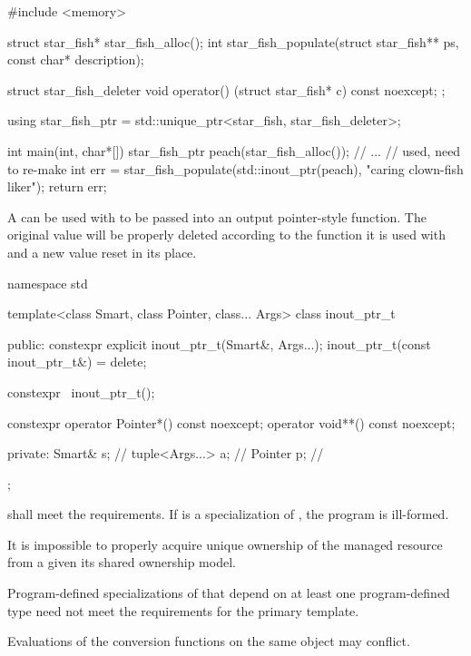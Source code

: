 \pnum
\begin{example}
\begin{codeblock}
#include <memory>

struct star_fish* star_fish_alloc();
int star_fish_populate(struct star_fish** ps, const char* description);

struct star_fish_deleter {
  void operator() (struct star_fish* c) const noexcept;
};

using star_fish_ptr = std::unique_ptr<star_fish, star_fish_deleter>;

int main(int, char*[]) {
  star_fish_ptr peach(star_fish_alloc());
  // ...
  // used, need to re-make
  int err = star_fish_populate(std::inout_ptr(peach), "caring clown-fish liker");
  return err;
}
\end{codeblock}
A  can be used with 
to be passed into an output pointer-style function.
The original value will be properly deleted
according to the function it is used with and
a new value reset in its place.
\end{example}

%
\begin{codeblock}
namespace std {
  template<class Smart, class Pointer, class... Args>
  class inout_ptr_t {
  public:
    constexpr explicit inout_ptr_t(Smart&, Args...);
    inout_ptr_t(const inout_ptr_t&) = delete;

    constexpr ~inout_ptr_t();

    constexpr operator Pointer*() const noexcept;
    operator void**() const noexcept;

  private:
    Smart& s;                   // \expos
    tuple<Args...> a;           // \expos
    Pointer p;                  // \expos
  };
}
\end{codeblock}

\pnum
{} shall meet the  requirements.
If  is a specialization of ,
the program is ill-formed.
\begin{note}
It is impossible to properly acquire unique ownership of the managed resource
from a  given its shared ownership model.
\end{note}

\pnum
Program-defined specializations of 
that depend on at least one program-defined type
need not meet the requirements for the primary template.

\pnum
Evaluations of the conversion functions on the same object
may conflict.

